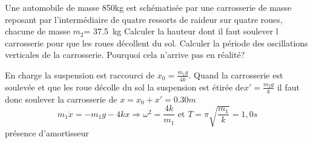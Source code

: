 \begin{Exercise}[title=Suspension de voiture]
  Une automobile de masse 850{}{kg} est schématisée par une carrosserie
  de masse  reposant par l'intermédiaire de quatre ressorts de
  raideur  sur quatre roues, chacune de masse $m_2$=
  \SI{37.5}{\kg}
  \Question Calculer la hauteur dont il faut soulever l  carrosserie pour que
  les roues décollent du sol.
   \Question Calculer la période des oscillations verticales de la carrosserie.
  \Question Pourquoi cela n'arrive pas en réalité?
\end{Exercise}
\begin{Answer}
  \Question En charge la suspension est raccourci de $x_0=\frac{m_1g}{4k}$. Quand
  la carrosserie est soulevée et que les roue décolle du sol la suspension est
  étirée de$x'=\frac{m_2g}{k}$ il faut donc soulever la carrosserie de
  $x=x_0+x'=0.30m$
  \Question
  \[m_1\ddot{x} =-m_1g -4kx \Rightarrow \omega^2 =\frac{4k}{m_1}\text{ et }
    T=\pi\sqrt{\frac{m_1}{k}} = 1,0 s\]
  \Question présence d'amortisseur
\end{Answer}
